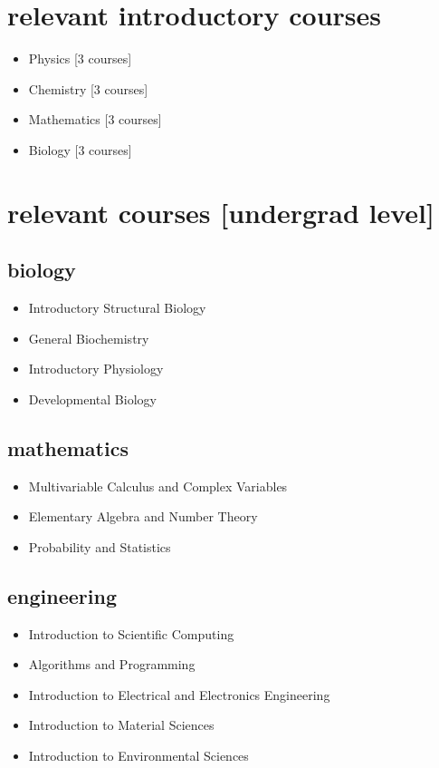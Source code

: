 \documentclass[11pt,print]{friggeri-cv}%
\begin{document}
\begin{multicols}{2}[]
\begin{minipage}{1.1\columnwidth}
\section{ relevant introductory courses }
\begin{itemize}
\item Physics {\small[3 courses]}
\item Chemistry {\small[3 courses]}
\item Mathematics {\small[3 courses]}
\item Biology {\small[3 courses]}
\end{itemize}



\end{minipage}

\hspace{-1em}
\begin{minipage}{1.05\columnwidth}



\section{relevant courses [undergrad level]}

\subsection{biology}
\begin{itemize}

\item Introductory Structural Biology
\item General Biochemistry
\item Introductory Physiology
\item Developmental Biology
\end{itemize}


\subsection{mathematics}
\begin{itemize}
\item Multivariable Calculus and Complex Variables
\item Elementary Algebra and Number Theory
\item Probability and Statistics
\end{itemize}



\subsection{engineering}
\begin{itemize}
\item Introduction to Scientific Computing
\item Algorithms and Programming
\item Introduction to Electrical and Electronics Engineering
\item Introduction to Material Sciences
\item Introduction to Environmental Sciences
\end{itemize}


\end{minipage}
\end{multicols}
\end{document}
